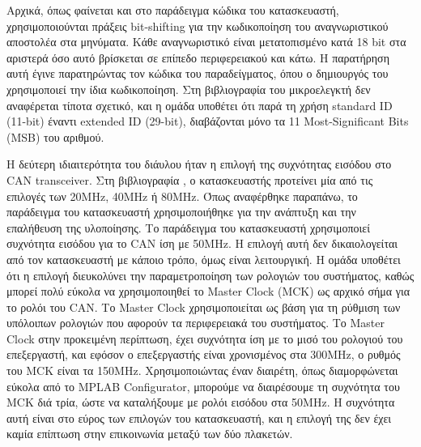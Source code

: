 \documentclass[a4paper,nobib,justified]{tufte-book}
\begin{document}
Αρχικά, όπως φαίνεται και στο παράδειγμα κώδικα του κατασκευαστή, χρησιμοποιούνται πράξεις bit-shifting για την κωδικοποίηση του αναγνωριστικού αποστολέα στα μηνύματα. Κάθε αναγνωριστικό είναι μετατοπισμένο κατά 18 bit στα αριστερά όσο αυτό βρίσκεται σε επίπεδο περιφερειακού και κάτω. Η παρατήρηση αυτή έγινε παρατηρώντας τον κώδικα του παραδείγματος, όπου ο δημιουργός του χρησιμοποιεί την ίδια κωδικοποίηση. Στη βιβλιογραφία του μικροελεγκτή  δεν αναφέρεται τίποτα σχετικό, και η ομάδα υποθέτει ότι παρά τη χρήση standard ID (11-bit) έναντι extended ID (29-bit), διαβάζονται μόνο τα 11 Most-Significant Bits (MSB) του αριθμού.


Η δεύτερη ιδιαιτερότητα του διάυλου ήταν η επιλογή της συχνότητας εισόδου στο CAN transceiver. Στη βιβλιογραφία \cite{datasheet}, ο κατασκευαστής προτείνει μία από τις επιλογές των 20MHz, 40MHz ή 80MHz. Όπως αναφέρθηκε παραπάνω, το παράδειγμα του κατασκευαστή χρησιμοποιήθηκε για την ανάπτυξη και την επαλήθευση της υλοποίησης. Το παράδειγμα του κατασκευαστή χρησιμοποιεί συχνότητα εισόδου για το CAN ίση με 50MHz. Η επιλογή αυτή δεν δικαιολογείται από τον κατασκευαστή με κάποιο τρόπο, όμως είναι λειτουργική. Η ομάδα υποθέτει ότι η επιλογή διευκολύνει την παραμετροποίηση των ρολογιών του συστήματος, καθώς μπορεί πολύ εύκολα να χρησιμοποιηθεί το Master Clock (MCK) ως αρχικό σήμα για το ρολόι του CAN. Το Master Clock χρησιμοποιείται ως βάση για τη ρύθμιση των υπόλοιπων ρολογιών που αφορούν τα περιφερειακά του συστήματος. Το Master Clock στην προκειμένη περίπτωση, έχει συχνότητα ίση με το μισό του ρολογιού του επεξεργαστή, και εφόσον ο επεξεργαστής είναι χρονισμένος στα 300MHz, ο ρυθμός του MCK είναι τα 150MHz. Χρησιμοποιώντας έναν διαιρέτη, όπως διαμορφώνεται εύκολα από το MPLAB Configurator, μπορούμε να διαιρέσουμε τη συχνότητα του MCK διά τρία, ώστε να καταλήξουμε με ρολόι εισόδου στα 50MHz. Η συχνότητα αυτή είναι στο εύρος των επιλογών του κατασκευαστή, και η επιλογή της δεν έχει καμία επίπτωση στην επικοινωνία μεταξύ των δύο πλακετών.
\end{document}
